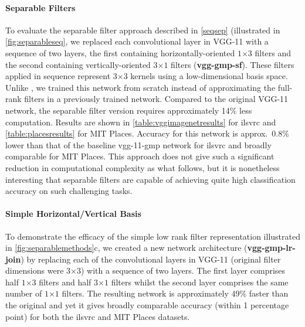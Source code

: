 \documentclass[thesis]{subfiles}
\begin{document}
    
    \paragraph{Separable Filters} To evaluate the separable filter approach described in \cref{seqsep} (illustrated in \cref{fig:separableseq}, we replaced each convolutional layer in VGG-11 with a sequence of two layers, the first containing horizontally-oriented $1$$\times$$3$ filters and the second containing vertically-oriented $3$$\times$$1$ filters (\textbf{vgg-gmp-sf}). These filters applied in sequence represent $3$$\times$$3$ kernels using a low-dimensional basis space. Unlike \citet{journals/corr/JaderbergVZ14}, we trained this network from scratch instead of approximating the full-rank filters in a previously trained network. Compared to the original VGG-11 network, the separable filter version requires approximately 14\% less computation. Results are shown in \cref{table:vggimagenetresults} for \gls{ilsvrc} and \cref{table:placesresults} for MIT Places. Accuracy for this network is approx.~0.8\% lower than that of the baseline vgg-11-gmp network for \gls{ilsvrc} and broadly comparable for MIT Places. This approach does not give such a significant reduction in computational complexity as what follows, but it is nonetheless interesting that separable  filters are capable of achieving quite high classification accuracy on such challenging tasks.
    
    \paragraph{Simple Horizontal/Vertical Basis} To demonstrate the efficacy of the simple low rank filter representation illustrated in \cref{fig:separablemethods}c, we created a new network architecture (\textbf{vgg-gmp-lr-join}) by replacing each of the convolutional layers in VGG-11 (original filter dimensions were $3$$\times$$3$) with a sequence of two layers. The first layer comprises half $1$$\times$$3$ filters and half $3$$\times$$1$ filters whilst the second layer comprises the same number of $1$$\times$$1$ filters. The resulting network is approximately 49\% faster than the original and yet it gives broadly comparable accuracy (within 1 percentage point) for both the \gls{ilsvrc} and MIT Places datasets.
    
\end{document}
